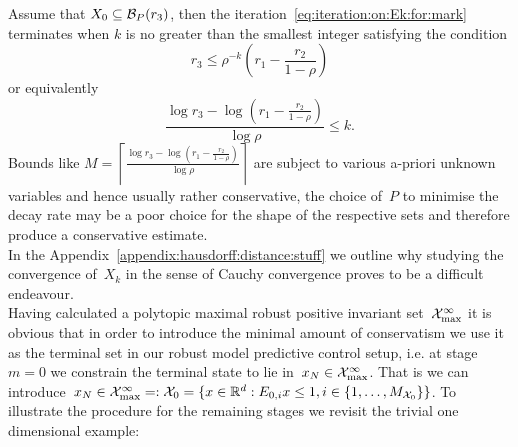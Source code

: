 %
Assume that $X_0\subseteq\mathcal B_P(r_3)$, then the iteration~\eqref{eq:iteration:on:Ek:for:mark} terminates when $k$ is no greater than the smallest integer satisfying the condition
%
\begin{equation}\label{eq:bound:on:iteration:count}
r_3\leq\rho^{-k}\left(r_1-\frac{r_2}{1-\rho}\right)
\end{equation}
%
or equivalently
%
\[
\frac{\log{r_3}-\log{\left(r_1-\frac{r_2}{1-\rho}\right)}}{\log{\rho}}\leq k.
\]
%
Bounds like $M = \left\lceil\frac{\log{r_3}-\log{\left(r_1-\frac{r_2}{1-\rho}\right)}}{\log{\rho}}\right\rceil$ are subject to various a-priori unknown variables and hence usually rather conservative, the choice of~$P$ to minimise the decay rate may be a poor choice for the shape of the respective sets and therefore produce a conservative estimate.
%
\\[1em]
%
In the Appendix~\ref{appendix:hausdorff:distance:stuff} we outline why studying the convergence of~$X_k$ in the sense of Cauchy convergence proves to be a difficult endeavour.
%
\\[1em]
%
Having calculated a polytopic maximal robust positive invariant set~$\mathcal X^\infty_{\max}$ it is obvious that in order to introduce the minimal amount of conservatism we use it as the terminal set in our robust model predictive control setup, i.e. at stage~$m=0$ we constrain the terminal state to lie in~$x_N\in\mathcal X^\infty_{\max}$.
%
That is we can introduce~$x_N\in\mathcal X^\infty_{\max} =: \mathcal X_0=\{x\in\mathbb R^d:E_{0,i}x\leq1,i\in\{1,\dots,M_{\mathcal X_0}\}\}$.
%
To illustrate the procedure for the remaining stages we revisit the trivial one dimensional example:
%
%
%
%
